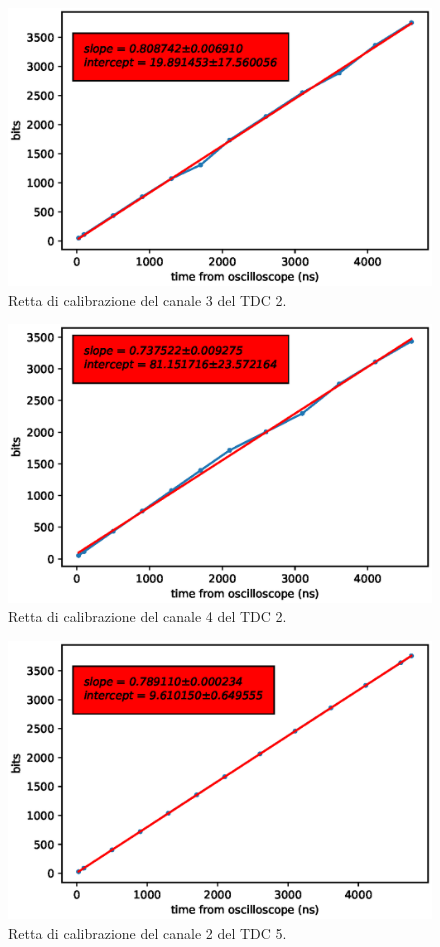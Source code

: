 \begin{figure}[H]
  \centering
  \includegraphics[width=.8\textwidth]{plots/tdc23.eps}
  \caption{Retta di calibrazione del canale 3 del TDC 2.}
  \label{fig:tdc23}
\end{figure}

\begin{figure}[H]
  \centering
  \includegraphics[width=.8\textwidth]{plots/tdc24.eps}
  \caption{Retta di calibrazione del canale 4 del TDC 2.}
  \label{fig:tdc24}
\end{figure}

\begin{figure}[H]
  \centering
  \includegraphics[width=.8\textwidth]{plots/tdc25.eps}
  \caption{Retta di calibrazione del canale 2 del TDC 5.}
  \label{fig:tdc25}
\end{figure}

